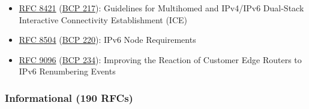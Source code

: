 \documentclass[
]{article}
\begin{document}
\begin{itemize}
\item
  \href{https://www.rfc-editor.org/info/rfc8421}{RFC 8421}
  (\href{https://www.rfc-editor.org/info/bcp217}{BCP 217}): Guidelines
  for Multihomed and IPv4/IPv6 Dual-Stack Interactive Connectivity
  Establishment (ICE)
\item
  \href{https://www.rfc-editor.org/info/rfc8504}{RFC 8504}
  (\href{https://www.rfc-editor.org/info/bcp220}{BCP 220}): IPv6 Node
  Requirements
\item
  \href{https://www.rfc-editor.org/info/rfc9096}{RFC 9096}
  (\href{https://www.rfc-editor.org/info/bcp234}{BCP 234}): Improving
  the Reaction of Customer Edge Routers to IPv6 Renumbering Events
\end{itemize}

\subsubsection{Informational (190 RFCs)}\label{informational-190-rfcs}
\end{document}
